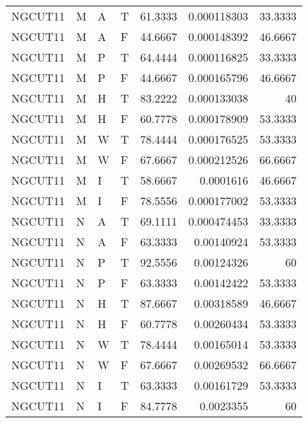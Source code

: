 \begin{tabular}{llllrrr}
    NGCUT11  & M     & A     & T          & 61.3333    & 0.000118303 & 33.3333  \\
    NGCUT11  & M     & A     & F          & 44.6667    & 0.000148392 & 46.6667  \\
    NGCUT11  & M     & P     & T          & 64.4444    & 0.000116825 & 33.3333  \\
    NGCUT11  & M     & P     & F          & 44.6667    & 0.000165796 & 46.6667  \\
    NGCUT11  & M     & H     & T          & 83.2222    & 0.000133038 & 40       \\
    NGCUT11  & M     & H     & F          & 60.7778    & 0.000178909 & 53.3333  \\
    NGCUT11  & M     & W     & T          & 78.4444    & 0.000176525 & 53.3333  \\
    NGCUT11  & M     & W     & F          & 67.6667    & 0.000212526 & 66.6667  \\
    NGCUT11  & M     & I     & T          & 58.6667    & 0.0001616   & 46.6667  \\
    NGCUT11  & M     & I     & F          & 78.5556    & 0.000177002 & 53.3333  \\
    NGCUT11  & N     & A     & T          & 69.1111    & 0.000474453 & 33.3333  \\
    NGCUT11  & N     & A     & F          & 63.3333    & 0.00140924  & 53.3333  \\
    NGCUT11  & N     & P     & T          & 92.5556    & 0.00124326  & 60       \\
    NGCUT11  & N     & P     & F          & 63.3333    & 0.00142422  & 53.3333  \\
    NGCUT11  & N     & H     & T          & 87.6667    & 0.00318589  & 46.6667  \\
    NGCUT11  & N     & H     & F          & 60.7778    & 0.00260434  & 53.3333  \\
    NGCUT11  & N     & W     & T          & 78.4444    & 0.00165014  & 53.3333  \\
    NGCUT11  & N     & W     & F          & 67.6667    & 0.00269532  & 66.6667  \\
    NGCUT11  & N     & I     & T          & 63.3333    & 0.00161729  & 53.3333  \\
    NGCUT11  & N     & I     & F          & 84.7778    & 0.0023355   & 60       \\
    \hline
\end{tabular}